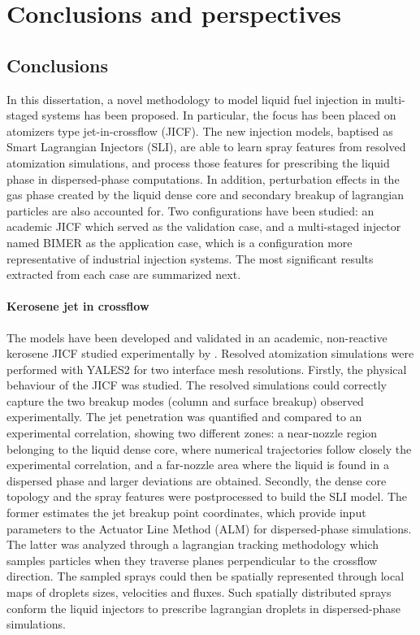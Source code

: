\chapter{Conclusions and perspectives}

\section*{Conclusions}

In this dissertation, a novel methodology to model liquid fuel injection in multi-staged systems has been proposed. In particular, the focus has been placed on atomizers type jet-in-crossflow (JICF). The new injection models, baptised as Smart Lagrangian Injectors (SLI), are able to learn spray features from resolved atomization simulations, and process those features for prescribing the liquid phase in dispersed-phase computations. In addition, perturbation effects in the gas phase created by the liquid dense core and secondary breakup of lagrangian particles are also accounted for. Two configurations have been studied: an academic JICF which served as the validation case, and a multi-staged injector named BIMER as the application case, which is a configuration more representative of industrial injection systems. The most significant results extracted from each case are summarized next.


\subsubsection*{Kerosene jet in crossflow}

The models have been developed and validated in an academic, non-reactive kerosene JICF studied experimentally by . Resolved atomization simulations were performed with YALES2 for two interface mesh resolutions. Firstly, the physical behaviour of the JICF was studied. The resolved simulations could correctly capture the two breakup modes (column and surface breakup) observed experimentally.  The jet penetration was quantified and compared to an experimental correlation, showing two different zones: a near-nozzle region belonging to the liquid dense core, where numerical trajectories follow closely the experimental correlation, and a far-nozzle area where the liquid is found in a dispersed phase and larger deviations are obtained. Secondly, the dense core topology and the spray features were postprocessed to build the SLI model. The former estimates the jet breakup point coordinates, which provide input parameters to the Actuator Line Method (ALM) for dispersed-phase simulations. The latter was analyzed through a lagrangian tracking methodology which samples particles when they traverse planes perpendicular to the crossflow direction. The sampled sprays could then be spatially represented through local maps of droplets sizes, velocities and fluxes. Such spatially distributed sprays conform the liquid injectors to prescribe lagrangian droplets in dispersed-phase simulations. \\

